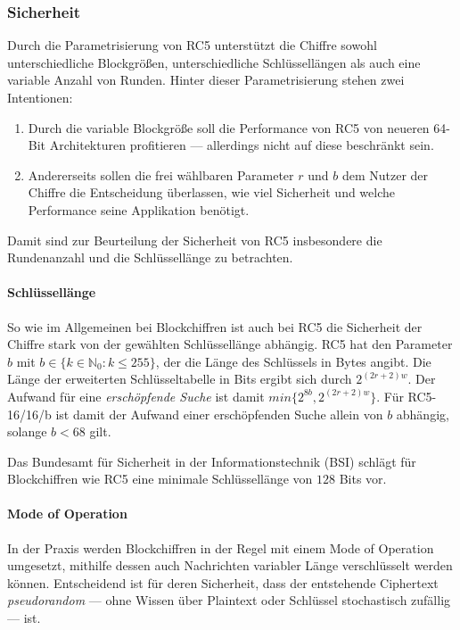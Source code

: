 \documentclass[course=erap]{aspdoc}
\begin{document}
\subsubsection{Sicherheit}

Durch die Parametrisierung von RC5\cite[p.2]{rc5rev} unterstützt die Chiffre sowohl unterschiedliche Blockgrößen, unterschiedliche Schlüssellängen als auch eine variable Anzahl von Runden. Hinter dieser Parametrisierung stehen zwei Intentionen:

\begin{enumerate}
    \item Durch die variable Blockgröße soll die Performance von RC5 von neueren 64-Bit Architekturen profitieren --- allerdings nicht auf diese beschränkt sein.\cite[p.1]{rc5rev}
    \item Andererseits sollen die frei wählbaren Parameter $r$ und $b$ dem Nutzer der Chiffre die Entscheidung überlassen, wie viel Sicherheit und welche Performance seine Applikation benötigt.\cite[p.1]{rc5rev}
\end{enumerate}

Damit sind zur Beurteilung der Sicherheit von RC5 insbesondere die Rundenanzahl und die Schlüssellänge zu betrachten.

\paragraph{Schlüssellänge} So wie im Allgemeinen bei Blockchiffren ist auch bei RC5 die Sicherheit der Chiffre stark von der gewählten Schlüssellänge abhängig. RC5 hat den Parameter $b$ mit $b \in \{k \in \mathbb{N}_0 \colon k \leq 255\}$, der die Länge des Schlüssels in Bytes angibt.\cite[p.3]{rc5rev} Die Länge der erweiterten Schlüsseltabelle in Bits ergibt sich durch $2^{(2r + 2)w}$.\cite[p.2]{rc5rev} Der Aufwand für eine \textit{erschöpfende Suche} ist damit $min\{2^{8b}, 2^{(2r + 2)w}\}$.\cite[p.29]{kaliski+yin} Für RC5-16/16/b ist damit der Aufwand einer erschöpfenden Suche allein von $b$ abhängig, solange $b < 68$ gilt.\bigbreak

Das Bundesamt für Sicherheit in der Informationstechnik (BSI) schlägt für Blockchiffren wie RC5 eine minimale Schlüssellänge von $128$ Bits vor.\cite[p.21]{bsi}

\paragraph{Mode of Operation} In der Praxis werden Blockchiffren in der Regel mit einem Mode of Operation umgesetzt, mithilfe dessen auch Nachrichten variabler Länge verschlüsselt werden können. Entscheidend ist für deren Sicherheit, dass der entstehende Ciphertext \textit{pseudorandom} --- ohne Wissen über Plaintext oder Schlüssel stochastisch zufällig\cite{pseudorandomness} --- ist.\bigbreak
\end{document}
